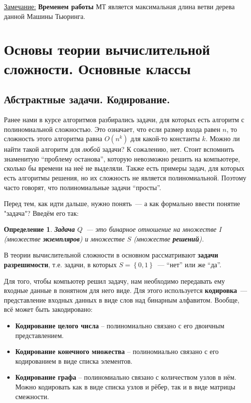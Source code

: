 \documentclass[a4paper,12pt]{article}
\newtheorem{definition}{Определение}
\newcommand{\note}{\underline{Замечание:} }
\begin{document}
\note{\textbf{Временем работы} МТ является максимальная длина ветви дерева данной Машины Тьюринга.}
\newpage
\section{Основы теории вычислительной сложности. Основные классы}
\subsection{Абстрактные задачи. Кодирование.}
Ранее нами в курсе алгоритмов разбирались задачи, для которых есть алгоритм с полиномиальной сложностью. Это означает, что если размер входа равен \(n\), то сложность этого алгоритма равна \(O(n^k)\) для какой-то константы \(k\). Можно ли найти такой алгоритм для \emph{любой} задачи? К сожалению, нет. Стоит вспомнить знаменитую ``проблему останова'', которую невозможно решить на компьютере, сколько бы времени на неё не выделяли. Также есть примеры задач, для которых есть алгоритмы решения, но их сложность не является полиномиальной. Поэтому часто говорят, что полиномиальные задачи ``просты''.
    
Перед тем, как идти дальше, нужно понять~--- а как формально ввести понятие "задача"? Введём его так:
\begin{definition}
    \textbf{Задача} \(Q\)~--- это бинарное отношение на множестве \(I\) (множестве \textbf{экземпляров}) и множестве \(S\) (множестве \textbf{решений}).
\end{definition}
В теории вычислительной сложности в основном рассматривают \textbf{задачи разрешимости}, т.е. задачи, в которых \(S = \left\{0, 1\right\}\)~--- ``нет'' или же ``да''. 

Для того, чтобы компьютер решил задачу, нам необходимо передавать ему входные данные в понятном для него виде. Для этого используется \textbf{кодировка}~--- представление входных данных в виде слов над бинарным алфавитом. Вообще, всё может быть закодировано:
\begin{itemize}
    \item \textbf{Кодирование целого числа} -- полиномиально связано с его двоичным представлением.
    \item \textbf{Кодирование конечного множества} -- полиномиально связано с его кодированием в виде списка элементов.
    \item \textbf{Кодирование графа} -- полиномиально связано с количеством узлов в нём. Можно кодировать как в виде списка узлов и рёбер, так и в виде матрицы смежности.
\end{itemize}
\end{document}
